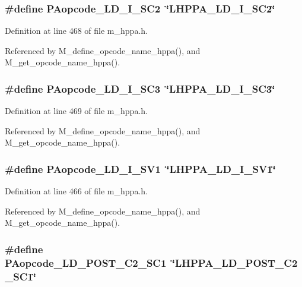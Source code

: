 \subsubsection{\setlength{\rightskip}{0pt plus 5cm}\#define PAopcode\_\-LD\_\-I\_\-SC2~\char`\"{}LHPPA\_\-LD\_\-I\_\-SC2\char`\"{}}\label{m__hppa_8h_aa13809c9c06656bf51e91fddfe58ac4}




Definition at line 468 of file m\_\-hppa.h.

Referenced by M\_\-define\_\-opcode\_\-name\_\-hppa(), and M\_\-get\_\-opcode\_\-name\_\-hppa().
\subsubsection{\setlength{\rightskip}{0pt plus 5cm}\#define PAopcode\_\-LD\_\-I\_\-SC3~\char`\"{}LHPPA\_\-LD\_\-I\_\-SC3\char`\"{}}\label{m__hppa_8h_f5beba1b8c41cb35d43f3277949cce05}




Definition at line 469 of file m\_\-hppa.h.

Referenced by M\_\-define\_\-opcode\_\-name\_\-hppa(), and M\_\-get\_\-opcode\_\-name\_\-hppa().
\subsubsection{\setlength{\rightskip}{0pt plus 5cm}\#define PAopcode\_\-LD\_\-I\_\-SV1~\char`\"{}LHPPA\_\-LD\_\-I\_\-SV1\char`\"{}}\label{m__hppa_8h_d5b446120a19515aefa7550472e6b209}




Definition at line 466 of file m\_\-hppa.h.

Referenced by M\_\-define\_\-opcode\_\-name\_\-hppa(), and M\_\-get\_\-opcode\_\-name\_\-hppa().
\subsubsection{\setlength{\rightskip}{0pt plus 5cm}\#define PAopcode\_\-LD\_\-POST\_\-C2\_\-SC1~\char`\"{}LHPPA\_\-LD\_\-POST\_\-C2\_\-SC1\char`\"{}}\label{m__hppa_8h_20de85593c9e9ed90e8d4e046c228b81}





